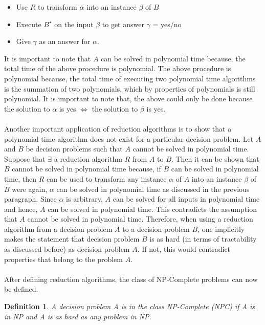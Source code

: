 \documentclass[12pt]{article}
\newtheorem{definition}{Definition}[subsection]
\numberwithin{equation}{subsection}
\numberwithin{table}{subsection}
\begin{document}
 \begin{itemize}
	\item Use $\mathit{R}$ to transform $\mathit{\alpha}$ into an instance $\mathit{\beta}$ of $\mathit{B}$
	\item Execute $\mathit{B^\star}$ on the input $\beta$ to get answer $\gamma$ = yes/no
	\item Give $\mathit{\gamma}$ as an answer for $\mathit{\alpha}$.
\end{itemize} 
It is important to note that $\mathit{A}$ can be solved in polynomial time because, the total time of the above procedure is polynomial. The above procedure is polynomial because, the total time of executing two polynomial time algorithms is the summation of two polynomials, which by properties of polynomials is still polynomial. It is important to note that, the above could only be done because the solution to $\alpha$ is yes $\iff$ the solution to $\beta$ is yes. \cite{cormen_leiserson_rivest_stein}\\\\
Another important application of reduction algorithms is to show that a polynomial time algorithm does not exist for a particular decision problem. Let $\mathit{A}$ and $\mathit{B}$ be decision problems such that $\mathit{A}$ cannot be solved in polynomial time. Suppose that $\exists$ a reduction algorithm $\mathit{R}$ from $\mathit{A}$ to $\mathit{B}$. Then it can be shown that $\mathit{B}$ cannot be solved in polynomial time because, if $\mathit{B}$ can be solved in polynomial time, then $\mathit{R}$ can be used to transform any instance $\alpha$ of $\mathit{A}$ into an instance $\beta$ of $\mathit{B}$ were again, $\alpha$ can be solved in polynomial time as discussed in the previous paragraph. Since $\alpha$ is arbitrary, $\mathit{A}$ can be solved for all inputs in polynomial time and hence, $\mathit{A}$ can be solved in polynomial time. This contradicts the assumption that $\mathit{A}$ cannot be solved in polynomial time. Therefore, when using a reduction algorithm from a decision problem $\mathit{A}$ to a decision problem $\mathit{B}$, one implicitly makes the statement that decision problem $\mathit{B}$ is as hard (in terms of tractability as discussed before) as decision problem $\mathit{A}$. If not, this would contradict properties that belong to the problem $\mathit{A}$. \cite{cormen_leiserson_rivest_stein}\\\\
After defining reduction algorithms, the class of NP-Complete problems can now be defined.
\begin{definition}
\label{NPC}
A decision problem A is in the class NP-Complete (NPC) if A is in NP and A is as hard as any problem in NP. { }
\end{definition}
\end{document}

